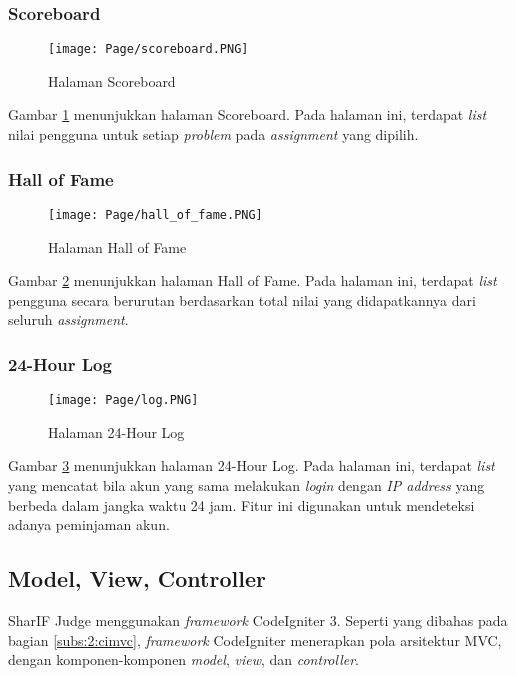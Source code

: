 \subsubsection{Scoreboard}
    \begin{figure}[H]
    	\centering  
    	\texttt{[image: Page/scoreboard.PNG]}  
    	\caption{Halaman Scoreboard}
    	\label{fig:3:scoreboard} 
    \end{figure} 
    
    Gambar \ref{fig:3:scoreboard} menunjukkan halaman Scoreboard. Pada halaman ini, terdapat \textit{list} nilai pengguna untuk setiap \textit{problem} pada \textit{assignment} yang dipilih.
    
\subsubsection{Hall of Fame}
    \begin{figure}[H]
    	\centering  
    	\texttt{[image: Page/hall\_of\_fame.PNG]}  
    	\caption{Halaman Hall of Fame}
    	\label{fig:3:hall_of_fame} 
    \end{figure} 
    
    Gambar \ref{fig:3:hall_of_fame} menunjukkan halaman Hall of Fame. Pada halaman ini, terdapat \textit{list} pengguna secara berurutan berdasarkan total nilai yang didapatkannya dari seluruh \textit{assignment}.

\subsubsection{24-Hour Log}
    \begin{figure}[H]
    	\centering  
    	\texttt{[image: Page/log.PNG]}  
    	\caption{Halaman 24-Hour Log}
    	\label{fig:3:log} 
    \end{figure} 
    
    Gambar \ref{fig:3:log} menunjukkan halaman 24-Hour Log. Pada halaman ini, terdapat \textit{list} yang mencatat bila akun yang sama melakukan \textit{login} dengan \textit{IP address} yang berbeda dalam jangka waktu 24 jam. Fitur ini digunakan untuk mendeteksi adanya peminjaman akun.

\subsection{Model, View, Controller}
\label{subs:3:mvc}
SharIF Judge menggunakan \textit{framework} CodeIgniter 3. Seperti yang dibahas pada bagian \ref{subs:2:cimvc}, \textit{framework} CodeIgniter menerapkan pola arsitektur MVC, dengan komponen-komponen \textit{model}, \textit{view}, dan \textit{controller}.

